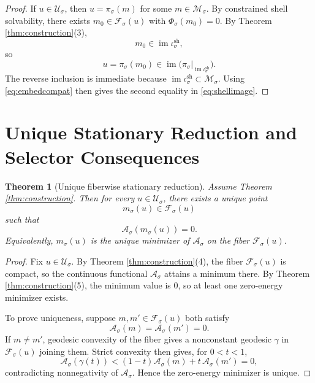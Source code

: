 \documentclass[11pt]{article}
\newcommand{\SubSpace}[1]{\mathcal M_{#1}}
\newcommand{\DataProj}[1]{\pi_{#1}}
\newcommand{\ShellEquation}[1]{\Phi_{#1}}
\newcommand{\Fiber}[1]{\mathcal F_{#1}}
\newcommand{\ShellEmbed}[1]{\iota_{#1}^{\mathrm{sh}}}
\newcommand{\StationaryFunctional}[1]{\mathscr A_{#1}}
\newcommand{\DeepSpace}[1]{\mathcal U_{#1}}
\newtheorem{theorem}{Theorem}
\begin{document}
\begin{proof}
If \(u\in\DeepSpace{\sigma}\), then \(u=\DataProj{\sigma}(m)\) for some \(m\in\SubSpace{\sigma}\). By constrained shell solvability, there exists \(m_{0}\in\Fiber{\sigma}(u)\) with \(\ShellEquation{\sigma}(m_{0})=0\). By Theorem \ref{thm:construction}(3),
\[
m_{0}\in\operatorname{im}\ShellEmbed{\sigma},
\]
so
\[
u=\DataProj{\sigma}(m_{0})\in
\operatorname{im}\bigl(\DataProj{\sigma}|_{\operatorname{im}\ShellEmbed{\sigma}}\bigr).
\]
The reverse inclusion is immediate because \(\operatorname{im}\ShellEmbed{\sigma}\subset\SubSpace{\sigma}\). Using \eqref{eq:embedcompat} then gives the second equality in \eqref{eq:shellimage}.
\end{proof}

\section{Unique Stationary Reduction and Selector Consequences}

\begin{theorem}[Unique fiberwise stationary reduction]
\label{thm:minimizer}
Assume Theorem \ref{thm:construction}. Then for every \(u\in\DeepSpace{\sigma}\), there exists a unique point
\[
m_{\sigma}(u)\in\Fiber{\sigma}(u)
\]
such that
\[
\StationaryFunctional{\sigma}(m_{\sigma}(u))=0.
\]
Equivalently, \(m_{\sigma}(u)\) is the unique minimizer of \(\StationaryFunctional{\sigma}\) on the fiber \(\Fiber{\sigma}(u)\).
\end{theorem}

\begin{proof}
Fix \(u\in\DeepSpace{\sigma}\). By Theorem \ref{thm:construction}(4), the fiber \(\Fiber{\sigma}(u)\) is compact, so the continuous functional \(\StationaryFunctional{\sigma}\) attains a minimum there. By Theorem \ref{thm:construction}(5), the minimum value is \(0\), so at least one zero-energy minimizer exists.

To prove uniqueness, suppose \(m,m'\in\Fiber{\sigma}(u)\) both satisfy
\[
\StationaryFunctional{\sigma}(m)=
\StationaryFunctional{\sigma}(m')=0.
\]
If \(m\neq m'\), geodesic convexity of the fiber gives a nonconstant geodesic \(\gamma\) in \(\Fiber{\sigma}(u)\) joining them. Strict convexity then gives, for \(0<t<1\),
\[
\StationaryFunctional{\sigma}(\gamma(t))
<
(1-t)\StationaryFunctional{\sigma}(m)
+
t\,\StationaryFunctional{\sigma}(m')
=
0,
\]
contradicting nonnegativity of \(\StationaryFunctional{\sigma}\). Hence the zero-energy minimizer is unique.
\end{proof}
\end{document}
